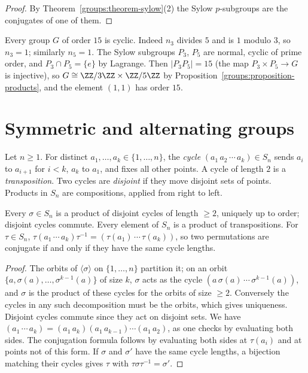 \begin{proof}
By Theorem~\ref{groups:theorem-sylow}(2) the Sylow $p$-subgroups are the
conjugates of one of them.
\end{proof}

\begin{example}\label{groups:example-order-15}
Every group $G$ of order $15$ is cyclic. Indeed $n_3$ divides $5$ and is $1$
modulo $3$, so $n_3 = 1$; similarly $n_5 = 1$. The Sylow subgroups $P_3$, $P_5$ are
normal, cyclic of prime order, and $P_3 \cap P_5 = \{e\}$ by Lagrange. Then
$|P_3P_5| = 15$ (the map $P_3 \times P_5 \to G$ is injective), so
$G \cong \ZZ/3\ZZ \times \ZZ/5\ZZ$ by Proposition~\ref{groups:proposition-products},
and the element $(1, 1)$ has order $15$.
\end{example}

\section{Symmetric and alternating groups}\label{groups:section-symmetric}

\begin{definition}\label{groups:definition-cycles}
Let $n \geq 1$. For distinct $a_1, \ldots, a_k \in \{1, \ldots, n\}$, the \emph{cycle}
$(a_1\, a_2\, \cdots\, a_k) \in S_n$ sends $a_i$ to $a_{i+1}$ for $i < k$, $a_k$ to $a_1$,
and fixes all other points. A cycle of length $2$ is a \emph{transposition}. Two
cycles are \emph{disjoint} if they move disjoint sets of points. Products in $S_n$
are compositions, applied from right to left.
\end{definition}

\begin{proposition}\label{groups:proposition-cycle-decomposition}
Every $\sigma \in S_n$ is a product of disjoint cycles of length $\geq 2$, uniquely up
to order; disjoint cycles commute. Every element of $S_n$ is a product of
transpositions. For $\tau \in S_n$,
$\tau (a_1\, \cdots\, a_k) \tau^{-1} = (\tau(a_1)\, \cdots\, \tau(a_k))$, so two
permutations are conjugate if and only if they have the same cycle lengths.
\end{proposition}

\begin{proof}
The orbits of $\langle \sigma \rangle$ on $\{1, \ldots, n\}$ partition it; on an orbit
$\{a, \sigma(a), \ldots, \sigma^{k-1}(a)\}$ of size $k$, $\sigma$ acts as the cycle
$(a\, \sigma(a)\, \cdots\, \sigma^{k-1}(a))$, and $\sigma$ is the product of these cycles for
the orbits of size $\geq 2$. Conversely the cycles in any such decomposition must be
the orbits, which gives uniqueness. Disjoint cycles commute since they act on
disjoint sets. We have $(a_1\, \cdots\, a_k) = (a_1\, a_k)(a_1\, a_{k-1}) \cdots (a_1\, a_2)$,
as one checks by evaluating both sides. The conjugation formula follows by
evaluating both sides at $\tau(a_i)$ and at points not of this form. If $\sigma$ and
$\sigma'$ have the same cycle lengths, a bijection matching their cycles gives $\tau$
with $\tau\sigma\tau^{-1} = \sigma'$.
\end{proof}

